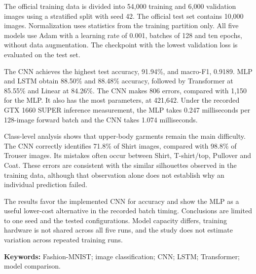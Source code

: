 \documentclass[10pt,a4paper]{article}
\begin{document}
The official training data is divided into 54,000 training and 6,000 validation
images using a stratified split with seed 42. The official test set contains
10,000 images. Normalization uses statistics from the training partition only.
All five models use Adam with a learning rate of 0.001, batches of 128 and ten
epochs, without data augmentation. The checkpoint with the lowest validation
loss is evaluated on the test set.

The CNN achieves the highest test accuracy, 91.94\%, and macro-F1, 0.9189.
MLP and LSTM obtain 88.50\% and 88.48\% accuracy, followed by Transformer at
85.55\% and Linear at 84.26\%. The CNN makes 806 errors, compared with
1,150 for the MLP. It also has the most parameters, at 421,642. Under the recorded
GTX 1660 SUPER inference measurement, the MLP takes 0.247 milliseconds per
128-image forward batch and the CNN takes 1.074 milliseconds.

Class-level analysis shows that upper-body garments remain the main difficulty.
The CNN correctly identifies 71.8\% of Shirt images, compared with 98.8\% of
Trouser images. Its mistakes often occur between Shirt, T-shirt/top, Pullover
and Coat. These errors are consistent with the similar silhouettes observed
in the training data, although that observation alone does not establish why
an individual prediction failed.

The results favor the implemented CNN for accuracy and show the MLP as a useful
lower-cost alternative in the recorded batch timing. Conclusions are limited
to one seed and the tested configurations. Model capacity differs, training
hardware is not shared across all five runs, and the study does not estimate
variation across repeated training runs.

\vspace{8pt}
\textbf{Keywords:} Fashion-MNIST; image classification; CNN; LSTM; Transformer;
model comparison.

\clearpage
\begingroup
\setlength{\parskip}{0pt}
\tableofcontents
\endgroup
\clearpage
{}

\clearpage

\clearpage

\clearpage

\clearpage

\clearpage

\clearpage

\clearpage

\clearpage
\appendix

\end{document}
